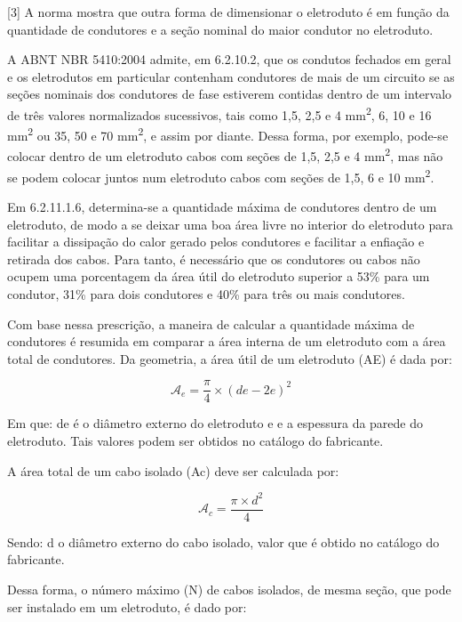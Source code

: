 [3] A norma mostra que outra forma de dimensionar o eletroduto é em função da quantidade de condutores e a seção nominal do maior condutor no eletroduto. 

A ABNT NBR 5410:2004 admite, em 6.2.10.2, que os condutos fechados em geral e os eletrodutos em particular contenham condutores de mais de um circuito se as seções nominais dos condutores de fase estiverem contidas dentro de um intervalo de três valores normalizados sucessivos, tais como 1,5, 2,5 e 4 mm\textsuperscript{2}, 6, 10 e 16 mm\textsuperscript{2} ou 35, 50 e 70 mm\textsuperscript{2}, e assim por diante. Dessa forma, por exemplo, pode-se colocar dentro de um eletroduto cabos com seções de 1,5, 2,5 e 4 mm\textsuperscript{2}, mas não se podem colocar juntos num eletroduto cabos com seções de 1,5, 6 e 10 mm\textsuperscript{2}.

Em 6.2.11.1.6, determina-se a quantidade máxima de condutores dentro de um eletroduto, de modo a se deixar uma boa área livre no interior do eletroduto para facilitar a dissipação do calor gerado pelos condutores e facilitar a enfiação e retirada dos cabos. Para tanto, é necessário que os condutores ou cabos não ocupem uma porcentagem da área útil do eletroduto superior a 53\% para um condutor, 31\% para dois condutores e 40\% para três ou mais condutores.

Com base nessa prescrição, a maneira de calcular a quantidade máxima de condutores é resumida em comparar a área interna de um eletroduto com a área total de condutores. Da geometria, a área útil de um eletroduto (AE) é dada por:

\begin{equation}
	\mathcal{A}_e = \frac{{\pi}}{4} \times (de - 2e)^2
\end{equation}

Em que: de é o diâmetro externo do eletroduto e e a espessura da parede do eletroduto. Tais valores podem ser obtidos no catálogo do fabricante.

A área total de um cabo isolado (Ac) deve ser calculada por:

\begin{equation}
	\mathcal{A}_c = \frac{{\pi \times d^2}}{4}
\end{equation}

Sendo: d o diâmetro externo do cabo isolado, valor que é obtido no catálogo do fabricante.

Dessa forma, o número máximo (N) de cabos isolados, de mesma seção, que pode ser instalado em um eletroduto, é dado por:

